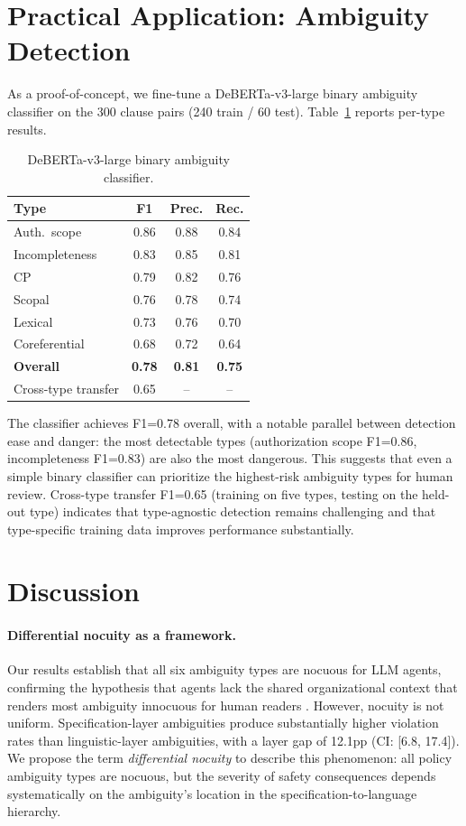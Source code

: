 \documentclass[11pt]{article}
\begin{document}
\section{Practical Application: Ambiguity Detection}
\label{sec:classifier}

As a proof-of-concept, we fine-tune a DeBERTa-v3-large binary ambiguity classifier on the 300 clause pairs (240 train / 60 test). Table~\ref{tab:classifier} reports per-type results.

\begin{table}[t]
\centering
\small
\caption{DeBERTa-v3-large binary ambiguity classifier.}
\label{tab:classifier}
\begin{tabular}{lccc}
\toprule
\textbf{Type} & \textbf{F1} & \textbf{Prec.} & \textbf{Rec.} \\
\midrule
Auth.\ scope & 0.86 & 0.88 & 0.84 \\
Incompleteness & 0.83 & 0.85 & 0.81 \\
CP & 0.79 & 0.82 & 0.76 \\
Scopal & 0.76 & 0.78 & 0.74 \\
Lexical & 0.73 & 0.76 & 0.70 \\
Coreferential & 0.68 & 0.72 & 0.64 \\
\midrule
\textbf{Overall} & \textbf{0.78} & \textbf{0.81} & \textbf{0.75} \\
Cross-type transfer & 0.65 & -- & -- \\
\bottomrule
\end{tabular}
\end{table}

The classifier achieves F1=0.78 overall, with a notable parallel between detection ease and danger: the most detectable types (authorization scope F1=0.86, incompleteness F1=0.83) are also the most dangerous. This suggests that even a simple binary classifier can prioritize the highest-risk ambiguity types for human review. Cross-type transfer F1=0.65 (training on five types, testing on the held-out type) indicates that type-agnostic detection remains challenging and that type-specific training data improves performance substantially.

\section{Discussion}

\paragraph{Differential nocuity as a framework.}
Our results establish that all six ambiguity types are nocuous for LLM agents, confirming the hypothesis that agents lack the shared organizational context that renders most ambiguity innocuous for human readers \citep{berry2003ambiguity}. However, nocuity is not uniform. Specification-layer ambiguities produce substantially higher violation rates than linguistic-layer ambiguities, with a layer gap of 12.1pp (CI: [6.8, 17.4]). We propose the term \emph{differential nocuity} to describe this phenomenon: all policy ambiguity types are nocuous, but the severity of safety consequences depends systematically on the ambiguity's location in the specification-to-language hierarchy.
\end{document}
